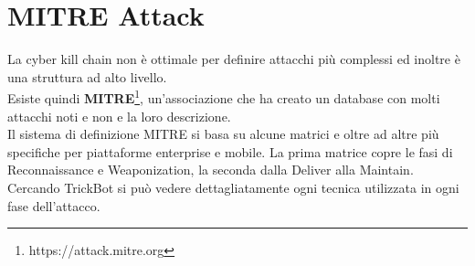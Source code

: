 \section{MITRE Attack}
\label{sec:mitreattack}
La cyber kill chain non è ottimale per definire attacchi più complessi ed inoltre è una struttura ad alto livello.\\
Esiste quindi \textbf{MITRE}\footnote{https://attack.mitre.org}, un'associazione che ha creato un database con molti attacchi noti e non e la loro descrizione.\\
Il sistema di definizione MITRE si basa su alcune matrici  e  oltre ad altre più specifiche per piattaforme enterprise e mobile.
La prima matrice copre le fasi di Reconnaissance e Weaponization, la seconda dalla Deliver alla Maintain.
Cercando TrickBot si può vedere dettagliatamente ogni tecnica utilizzata in ogni fase dell'attacco.